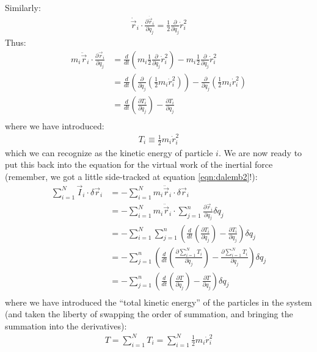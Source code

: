 Similarly:
\begin{align}
\dot{\vec{r}}_i\cdot\frac{\partial\dot{\vec{r}}_i}{\partial q_j}
=\frac{1}{2}\frac{\partial}{\partial q_j}\dot{r}_i^2
\end{align}
Thus:
\begin{align}
m_i\ddot{\vec{r}}_i\cdot\frac{\partial\vec{r}_i}{\partial q_j} &= \frac{d}{dt}\left(m_i\frac{1}{2}\frac{\partial}{\partial \dot{q}_j}\dot{r}_i^2\right) - m_i\frac{1}{2}\frac{\partial}{\partial q_j}\dot{r}_i^2\nonumber\\
&=\frac{d}{dt}\left(\frac{\partial}{\partial \dot{q}_j}(\frac{1}{2}m_i\dot{r}_i^2)\right) - \frac{\partial}{\partial q_j}(\frac{1}{2}m_i\dot{r}_i^2)\nonumber\\
&=\frac{d}{dt}\left(\frac{\partial T_i}{\partial \dot{q}_j} \right) - \frac{\partial T_i}{\partial q_j}\nonumber\\
\end{align}
where we have introduced:
\begin{align}
T_i\equiv\frac{1}{2}m_i\dot{r}_i^2
\end{align}
which we can recognize as the kinetic energy of particle $i$. We are now ready to put this back into the equation for the virtual work of the inertial force (remember, we got a little side-tracked at equation \ref{eqn:dalemb2}!):
\begin{align}
\sum_{i=1}^N \vec{I}_i\cdot\delta\vec{r}_i&=-\sum_{i=1}^N m_i\ddot{\vec{r}}_i\cdot\delta\vec{r}_i\nonumber\\
&=-\sum_{i=1}^N m_i\ddot{\vec{r}}_i\cdot\sum_{j=1}^n\frac{\partial\vec{r}_i}{\partial q_j}\delta q_j   \nonumber\\
&=-\sum_{i=1}^N\sum_{j=1}^n\left(\frac{d}{dt}\left(\frac{\partial T_i}{\partial \dot{q}_j} \right) - \frac{\partial T_i}{\partial q_j}\right)\delta q_j   \nonumber\\
&=-\sum_{j=1}^n\left(\frac{d}{dt}\left(\frac{\partial\sum_{i=1}^N T_i}{\partial \dot{q}_j} \right) - \frac{\partial\sum_{i=1}^N T_i}{\partial q_j}\right)\delta q_j   \nonumber\\
&=-\sum_{j=1}^n\left(\frac{d}{dt}\left(\frac{\partial T}{\partial \dot{q}_j} \right) - \frac{\partial T}{\partial q_j}\right)\delta q_j   \nonumber\\
\end{align}
where we have introduced the ``total kinetic energy'' of the particles in the system (and taken the liberty of swapping the order of summation, and bringing the summation into the derivatives):
\begin{align}
T=\sum_{i=1}^N T_i=\sum_{i=1}^N\frac{1}{2}m_i\dot{r}_i^2
\end{align}
